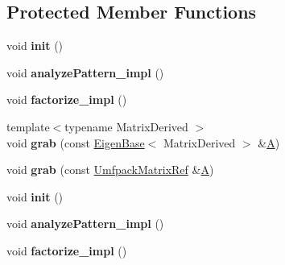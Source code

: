 \subsection*{Protected Member Functions}
\begin{DoxyCompactItemize}
\item 
\mbox{\label{class_eigen_1_1_umf_pack_l_u_a5a5adf4464c78eb83aafa7cbf9ad39cf}} 
void {\bfseries init} ()
\item 
\mbox{\label{class_eigen_1_1_umf_pack_l_u_a9d319cce61d8797d1f0ba6b6ae3087c9}} 
void {\bfseries analyze\+Pattern\+\_\+impl} ()
\item 
\mbox{\label{class_eigen_1_1_umf_pack_l_u_a23ec2a84911a59ee4295d309d975a3d5}} 
void {\bfseries factorize\+\_\+impl} ()
\item 
\mbox{\label{class_eigen_1_1_umf_pack_l_u_a1b47abf8be308bbd60c37f3a0940fc43}} 
{\footnotesize template$<$typename Matrix\+Derived $>$ }\\void {\bfseries grab} (const \hyperlink{group___core___module_struct_eigen_1_1_eigen_base}{Eigen\+Base}$<$ Matrix\+Derived $>$ \&\hyperlink{group___core___module_class_eigen_1_1_matrix}{A})
\item 
\mbox{\label{class_eigen_1_1_umf_pack_l_u_ac17fdc73306848870023e90bd3da8b70}} 
void {\bfseries grab} (const \hyperlink{group___core___module}{Umfpack\+Matrix\+Ref} \&\hyperlink{group___core___module_class_eigen_1_1_matrix}{A})
\item 
\mbox{\label{class_eigen_1_1_umf_pack_l_u_a5a5adf4464c78eb83aafa7cbf9ad39cf}} 
void {\bfseries init} ()
\item 
\mbox{\label{class_eigen_1_1_umf_pack_l_u_a9d319cce61d8797d1f0ba6b6ae3087c9}} 
void {\bfseries analyze\+Pattern\+\_\+impl} ()
\item 
\mbox{\label{class_eigen_1_1_umf_pack_l_u_a23ec2a84911a59ee4295d309d975a3d5}} 
void {\bfseries factorize\+\_\+impl} ()
\item 
\mbox{\label{class_eigen_1_1_umf_pack_l_u_a1b47abf8be308bbd60c37f3a0940fc43}} 

\end{DoxyCompactItemize}
